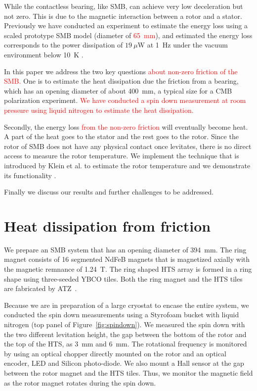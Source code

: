 \documentclass[journal]{IEEEtran}
\def\cred{\textcolor{red}}
\begin{document}
While the contactless bearing, like SMB, can achieve very low deceleration but not zero.
This is due to the magnetic interaction between a rotor and a stator.
Previously we have conducted an experiment to estimate the energy loss using a scaled prototype SMB model (diameter of \cred{65~mm}), and estimated the energy loss corresponds to the power dissipation of $19~\mu$W at 1~Hz under the vacuum environment below 10~K \cite{matsumura_eucas2015}.

In this paper we address the two key questions \cred{about non-zero friction of the SMB.}
One is to estimate the heat dissipation due the friction from a bearing, which has an opening diameter of about 400~mm, a typical size for a CMB polarization experiment.
\cred{We have conducted a spin down measurement at room pressure using liquid nitrogen to estimate the heat dissipation.}

Secondly, the energy loss \cred{from the non-zero friction} will eventually become heat.
A part of the heat goes to the stator and the rest goes to the rotor.
Since the rotor of SMB does not have any physical contact once levitates, there is no direct access to measure the rotor temperature.
We implement the technique that is introduced by Klein et al. to estimate the rotor temperature and we demonstrate its functionality \cred{\cite{jklein}}.

Finally we discuss our results and further challenges to be addressed.

\section{Heat dissipation from friction}
We prepare an SMB system that has an opening diameter of 394~mm.
The ring magnet consists of 16 segmented NdFeB magnets that is magnetized axially with the magnetic remnance of 1.24~T.
The ring shaped HTS array is formed in a ring shape using three-seeded YBCO tiles.
Both the ring magnet and the HTS tiles are fabricated by ATZ~\cite{atz}.

Because we are in preparation of a large cryostat to encase the entire system, we conducted the spin down measurements using a Styrofoam bucket with liquid nitrogen (top panel of Figure~\ref{fig:spindown}).
We measured the spin down with the two different levitation height, the gap between the bottom of the rotor and the top of the HTS, as 3~mm and 6~mm.
The rotational frequency is monitored by using an optical chopper directly mounted on the rotor and an optical encoder, LED and Silicon photo-diode.
We also mount a Hall sensor at the gap between the rotor magnet and the HTS tiles.
Thus, we monitor the magnetic field as the rotor magnet rotates during the spin down.
\end{document}
